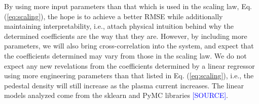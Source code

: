 \documentclass[a4paper, twoside, final, 12pt]{article}
\begin{document}

By using more input parameters than that which is used in the scaling law, Eq. (\ref{eq:scaling}), the hope is to achieve a better RMSE while additionally maintaining interpretability, i.e., attach physical intuition behind why the determined coefficients are the way that they are. However, by including more parameters, we will also bring cross-correlation into the system, and expect that the coefficients determined may vary from those in the scaling law. We do not expect any new revelations from the coefficients determined by a linear regressor using more engineering parameters than that listed in Eq. (\ref{eq:scaling}), i.e., the pedestal density will still increase as the plasma current increases.  The linear models analyzed come from the sklearn and PyMC libraries \textcolor{blue}{[SOURCE]}. 
\end{document}
